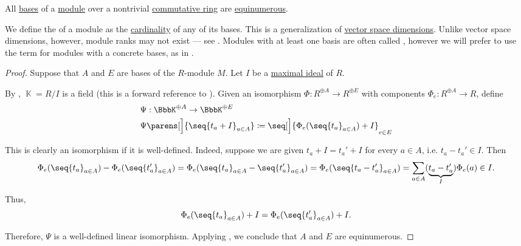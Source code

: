 \begin{proposition}\label{thm:commutative_module_rank}
  All \hyperref[def:hamel_basis]{bases} of a \hyperref[def:module]{module} over a nontrivial \hyperref[def:ring/commutative]{commutative ring} are \hyperref[def:equinumerosity]{equinumerous}.

  We define the  of a module as the \hyperref[thm:cardinality_existence]{cardinality} of any of its bases. This is a generalization of \hyperref[thm:vector_space_dimension]{vector space dimensions}. Unlike vector space dimensions, however, module ranks may not exist --- see . Modules with at least one basis are often called , however we will prefer to use the term for modules with a concrete bases, as in .
\end{proposition}
\begin{proof}
  Suppose that \( A \) and \( E \) are bases of the \( R \)-module \( M \). Let \( I \) be a \hyperref[def:semiring_ideal/maximal]{maximal ideal} of \( R \).

  By , \( \BbbK = R / I \) is a field (this is a forward reference to ). Given an isomorphism \( \Phi: R^{\oplus A} \to R^{\oplus E} \) with components \( \Phi_e: R^{\oplus A} \to R \), define
  \begin{equation*}
    \begin{aligned}
      &\Psi: \BbbK^{\oplus A} \to \BbbK^{\oplus E} \\
      &\Psi\parens[\Big]{ \seq{ t_a + I }_{a \in A} } \coloneqq \seq[\Big]{ \Phi_e(\seq{ t_a }_{a \in A}) + I }_{e \in E}
    \end{aligned}
  \end{equation*}

  This is clearly an isomorphism if it is well-defined. Indeed, suppose we are given \( t_a + I = t_a' + I \) for every \( a \in A \), i.e. \( t_a - t_a' \in I \). Then
  \small
  \begin{equation*}
    \Phi_e(\seq{ t_a }_{a \in A}) - \Phi_e(\seq{ t_a' }_{a \in A})
    =
    \Phi_e(\seq{ t_a }_{a \in A} - \seq{ t_a' }_{a \in A})
    =
    \Phi_e(\seq{ t_a - t_a' }_{a \in A})
    =
    \sum_{a \in A} (\underbrace{ t_a - t_a' }_I) \Phi_e(a)
    \in
    I.
  \end{equation*}
  \normalsize

  Thus,
  \begin{equation*}
    \Phi_e(\seq{ t_a }_{a \in A}) + I = \Phi_e(\seq{ t_a' }_{a \in A}) + I.
  \end{equation*}

  Therefore, \( \Psi \) is a well-defined linear isomorphism. Applying , we conclude that \( A \) and \( E \) are equinumerous.
\end{proof}

